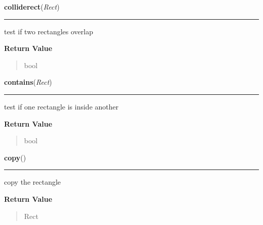 \hspace{.8\funcindent}\begin{boxedminipage}{\funcwidth}

    \raggedright \textbf{colliderect}(\textit{Rect})

    \vspace{-1.5ex}

    \rule{\textwidth}{0.5\fboxrule}
\setlength{\parskip}{2ex}
    test if two rectangles overlap

\setlength{\parskip}{1ex}
      \textbf{Return Value}
    \vspace{-1ex}

      \begin{quote}
      bool

      \end{quote}

    \end{boxedminipage}

    \label{pygame:Rect:contains}

    \vspace{0.5ex}

\hspace{.8\funcindent}\begin{boxedminipage}{\funcwidth}

    \raggedright \textbf{contains}(\textit{Rect})

    \vspace{-1.5ex}

    \rule{\textwidth}{0.5\fboxrule}
\setlength{\parskip}{2ex}
    test if one rectangle is inside another

\setlength{\parskip}{1ex}
      \textbf{Return Value}
    \vspace{-1ex}

      \begin{quote}
      bool

      \end{quote}

    \end{boxedminipage}

    \label{pygame:Rect:copy}

    \vspace{0.5ex}

\hspace{.8\funcindent}\begin{boxedminipage}{\funcwidth}

    \raggedright \textbf{copy}()

    \vspace{-1.5ex}

    \rule{\textwidth}{0.5\fboxrule}
\setlength{\parskip}{2ex}
    copy the rectangle

\setlength{\parskip}{1ex}
      \textbf{Return Value}
    \vspace{-1ex}

      \begin{quote}
      Rect

      \end{quote}

    \end{boxedminipage}

